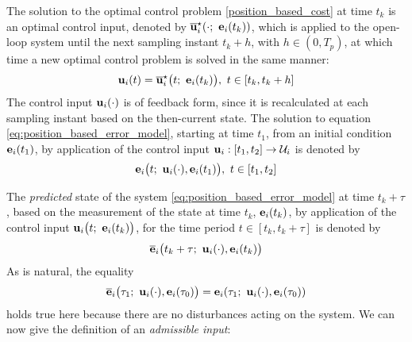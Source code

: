 The solution to the optimal control problem \eqref{position_based_cost}
at time $t_k$ is an optimal control input, denoted by
$\overline{\bm{\mathbf{u}}}_i^{\star}(\cdot;\ \bm{\mathbf{e}}_i(t_k))$, which
is applied to the open-loop system until the next sampling instant $t_k + h$,
with $h \in (0,T_p)$, at which time a new optimal control problem is solved in
the same manner:
\begin{align}
  \bm{\mathbf{u}}_i(t) = \overline{\bm{\mathbf{u}}}_i^{\star}\big(t;\ \bm{\mathbf{e}}_i(t_k)\big),\  t \in [t_k, t_k + h]
 \label{eq:position_based_optimal_u}
\end{align}
The control input $\bm{\mathbf{u}}_i(\cdot)$ is of feedback form,
since it is recalculated at each sampling instant based on the then-current
state. The solution to equation \eqref{eq:position_based_error_model}, starting at time
$t_1$, from an initial condition $\bm{\mathbf{e}}_i(t_1)$, by application of the
control input $\bm{\mathbf{u}}_i : [t_1, t_2] \to \mathcal{U}_i$ is denoted by
\begin{align}
  \bm{\mathbf{e}}_i\big(t;\ \bm{\mathbf{u}}_i(\cdot), \bm{\mathbf{e}}_i(t_1)\big),\ t \in [t_1, t_2]
\end{align}

The \textit{predicted} state of the system \eqref{eq:position_based_error_model}
at time $t_k + \tau$, based on the measurement of the state at time
$t_k$, $\bm{\mathbf{e}}_i(t_k)$, by application of the control input
$\bm{\mathbf{u}}_i\big(t;\ \bm{\mathbf{e}}_i(t_k)\big)$, for the time period $t \in [t_k, t_k + \tau]$
is denoted by
\begin{align}
  \overline{\bm{\mathbf{e}}}_i\big(t_k + \tau;\ \bm{\mathbf{u}}_i(\cdot), \bm{\mathbf{e}}_i(t_k)\big) \label{eq:position_based_predicted_error_0}
\end{align}
As is natural, the equality
\begin{align}
  \overline{\bm{\mathbf{e}}}_i\big(\tau_1;\ \bm{\mathbf{u}}_i(\cdot), \bm{\mathbf{e}}_i(\tau_0)\big) =
  \bm{\mathbf{e}}_i(\tau_1;\ \bm{\mathbf{u}}_i(\cdot), \bm{\mathbf{e}}_i(\tau_0))
  \label{eq:error_now_to_predicted_error}
\end{align}
holds true here because there are no disturbances acting on the system.
We can now give the definition of an \textit{admissible input}:

